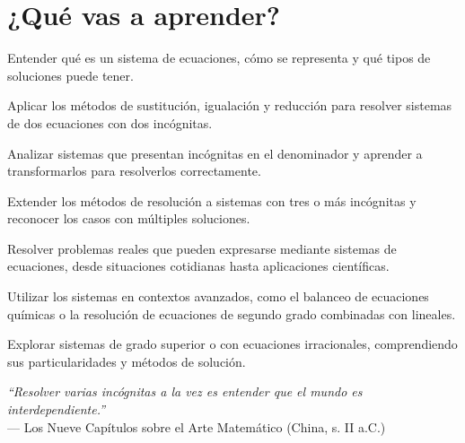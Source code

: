 \section*{¿Qué vas a aprender?}
\begin{aprende}
  \item Entender qué es un sistema de ecuaciones, cómo se representa y qué tipos de soluciones puede tener.  
  \item Aplicar los métodos de sustitución, igualación y reducción para resolver sistemas de dos ecuaciones con dos incógnitas.  
  \item Analizar sistemas que presentan incógnitas en el denominador y aprender a transformarlos para resolverlos correctamente.  
  \item Extender los métodos de resolución a sistemas con tres o más incógnitas y reconocer los casos con múltiples soluciones.  
  \item Resolver problemas reales que pueden expresarse mediante sistemas de ecuaciones, desde situaciones cotidianas hasta 
  aplicaciones científicas.  
  \item Utilizar los sistemas en contextos avanzados, como el balanceo de ecuaciones químicas o la resolución de ecuaciones 
  de segundo grado combinadas con lineales.  
  \item Explorar sistemas de grado superior o con ecuaciones irracionales, comprendiendo sus particularidades y métodos de solución.  
\end{aprende}

\vspace{1cm}
\begin{flushright}
  {\oneptup\itshape ``Resolver varias incógnitas a la vez es entender que el mundo es interdependiente.''}\\
  {\oneptup — Los Nueve Capítulos sobre el Arte Matemático (China, s. II a.C.)}
\end{flushright}

